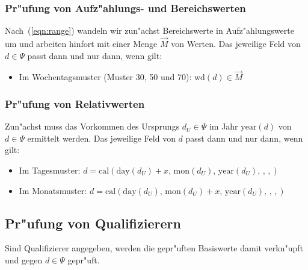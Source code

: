 \documentclass[a4paper]{article}
\newcommand*{\dayf}{\mathrm{day}}
\newcommand*{\monf}{\mathrm{mon}}
\newcommand*{\yearf}{\mathrm{year}}
\newcommand*{\wdf}{\mathrm{wd}}
\newcommand*{\calf}{\mathrm{cal}}
\numberwithin{equation}{section}
\begin{document}
\subsubsection{Pr"ufung von Aufz"ahlungs- und Bereichswerten}
Nach~(\ref{eqn:range}) wandeln wir zun"achst Bereichswerte in Aufz"ahlungswerte
um und arbeiten hinfort mit einer Menge $\vec{M}$ von Werten. Das jeweilige Feld
von $d \in \Psi$ passt dann und nur dann, wenn gilt:
\begin{itemize}
  \item Im Wochentagsmuster (Muster 30, 50 und 70): $\wdf(d) \in \vec{M}$
\end{itemize}

\subsubsection{Pr"ufung von Relativwerten}
Zun"achst muss das Vorkommen des Ursprungs $d_U \in \Psi$ im Jahr $\yearf(d)$
von $d \in \Psi$ ermittelt werden. Das jeweilige Feld von $d$ passt dann und nur
dann, wenn gilt:
\begin{itemize}
  \item Im Tagesmuster: $d = \calf(\dayf(d_U) + x,\,\monf(d_U),\,\yearf(d_U),\,,\,,)$
  \item Im Monatsmuster: $d = \calf(\dayf(d_U),\,\monf(d_U) + x,\,\yearf(d_U),\,,\,,)$
\end{itemize}


%
%
\subsection{Pr"ufung von Qualifizierern}
Sind Qualifizierer angegeben, werden die gepr"uften Basiswerte damit verkn"upft
und gegen $d \in \Psi$ gepr"uft.
\end{document}
